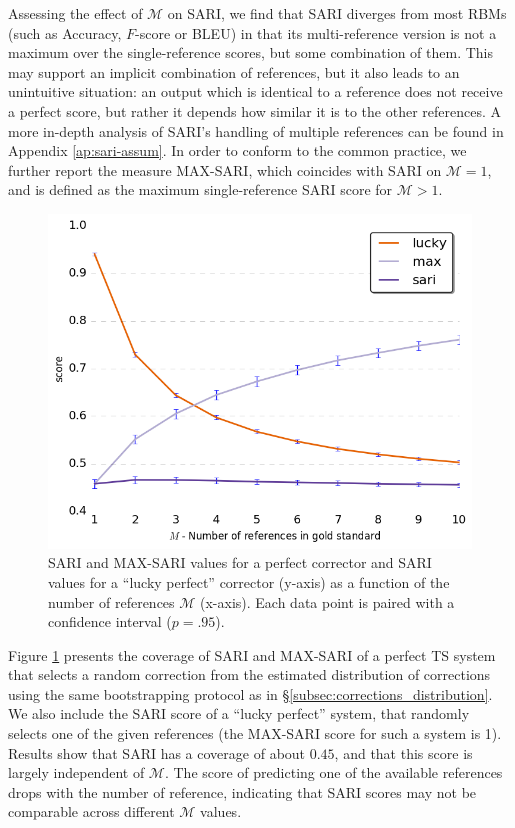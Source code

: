 \documentclass[letterpaper, 11pt]{article}
\begin{document}
Assessing the effect of $\mathcal{M}$ on SARI, we find that SARI diverges from most RBMs (such as Accuracy, $F$-score or BLEU) 
in that its multi-reference version is not a maximum over the single-reference scores, but some combination of them.
This may support an implicit combination of references, but it also leads to an unintuitive situation: an output
which is identical to a reference does not receive a perfect score, but rather it depends how similar it is to the other
references. A more in-depth analysis of SARI's handling of multiple references can be found in Appendix \ref{ap:sari-assum}.
In order to conform to the common practice, we further report the measure MAX-SARI, which coincides with SARI on $\mathcal{M}=1$, 
and is defined as the maximum single-reference SARI score for $\mathcal{M}>1$.

\begin{figure}
	\includegraphics[width=0.9\columnwidth]{lucky,max,sari_Ms_significance}
	\caption{
		SARI and MAX-SARI values for a perfect corrector and SARI values for a ``lucky perfect'' corrector (y-axis) as a function of the number of references $\mathcal{M}$ (x-axis).
		Each data point is paired with a confidence interval ($p=.95$).\label{fig:SARI_Ms}}
	\vspace{-0.5cm}
\end{figure}

Figure \ref{fig:SARI_Ms} presents the coverage of SARI and MAX-SARI of a perfect TS system that selects a random correction
from the estimated distribution of corrections using the same bootstrapping protocol as in \S\ref{subsec:corrections_distribution}.
We also include the SARI score of a ``lucky perfect'' system, that randomly selects one of 
the given references (the MAX-SARI score for such a system is 1). 
Results show that SARI has a coverage of about $0.45$, and that this score is largely independent of $\mathcal{M}$.
The score of predicting one of the available references drops with the number of reference, indicating that SARI scores may not be comparable
across different $\mathcal{M}$ values. 
\end{document}
